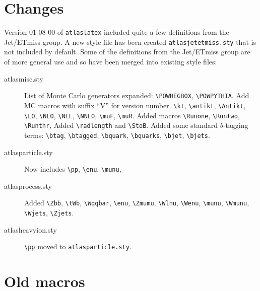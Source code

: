 \documentclass[UKenglish,texlive=2013]{\ATLASLATEXPATH atlasdoc}
\newcommand{\File}[1]{\texttt{#1}\xspace}
\newcommand{\Macro}[1]{\texttt{\textbackslash #1}\xspace}
\newcommand{\Package}[1]{\texttt{#1}\xspace}
\begin{document}
{\onecolumn
\section{Changes}
\label{sec:change}

Version 01-08-00 of \Package{atlaslatex} included quite a few definitions from the Jet/ETmiss group.
A new style file has been created \texttt{atlasjetetmiss.sty} that is not included by default.
Some of the definitions from the Jet/ETmiss group are of more general use and so have been merged into existing style files:
\begin{description}
\item[atlasmisc.sty] List of Monte Carlo generators expanded:
  \Macro{POWHEGBOX}, \Macro{POWPYTHIA}.
  Add MC macros with suffix \enquote{V} for version number.
  \Macro{kt}, \Macro{antikt}, \Macro{Antikt}, \Macro{LO}, \Macro{NLO}, \Macro{NLL}, \Macro{NNLO},
  \Macro{muF}, \Macro{muR}.
  Added macros \Macro{Runone}, \Macro{Runtwo}, \Macro{Runthr},
  Added \Macro{radlength} and \Macro{StoB}.
  Added some standard $b$-tagging terms:
  \Macro{btag}, \Macro{btagged}, \Macro{bquark}, \Macro{bquarks}, \Macro{bjet}, \Macro{bjets}.
\item[atlasparticle.sty] Now includes \Macro{pp}, \Macro{enu}, \Macro{munu},
\item[atlasprocess.sty] Added \Macro{Zbb}, \Macro{tWb}, \Macro{Wqqbar}, \Macro{enu}, \Macro{Zmumu},
  \Macro{Wlnu}, \Macro{Wenu}, \Macro{munu}, \Macro{Wmunu}, \Macro{Wjets}, \Macro{Zjets}.
\item[atlasheavyion.sty] \Macro{pp} moved to \File{atlasparticle.sty}.
\end{description}

\section{Old macros}
\label{sec:old}

}
\end{document}
